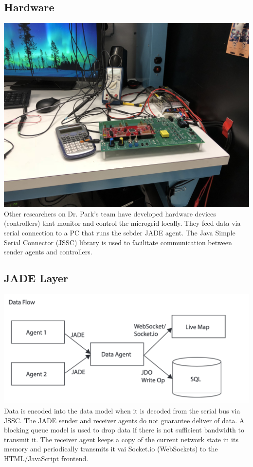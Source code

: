 \documentclass{article}
\begin{document}
\subsection{Hardware}
\includegraphics[width=\textwidth]{screenshots/hardware.jpg}
Other researchers on Dr. Park's team have developed hardware devices (controllers) that monitor and control the microgrid locally. They feed data via serial connection to a PC that runs the sebder JADE agent. The Java Simple Serial Connector (JSSC) library is used to facilitate communication between sender agents and controllers.

\subsection{JADE Layer}
\includegraphics[width=\textwidth]{screenshots/simplifiedDataFlow.png}
Data is encoded into the data model when it is decoded from the serial bus via JSSC. The JADE sender and receiver agents do not guarantee deliver of data. A blocking queue model is used to drop data if there is not sufficient bandwidth to transmit it. The receiver agent keeps a copy of the current network state in its memory and periodically transmits it vai Socket.io (WebSockets) to the HTML/JavaScript frontend.
\end{document}
